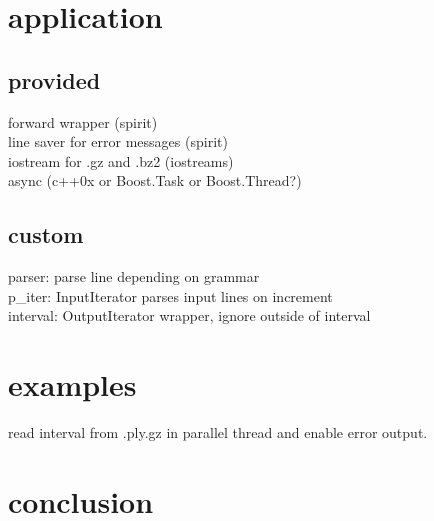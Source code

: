 \documentclass[a4paper,parskip=half]{scrartcl}
\begin{document}
\section{application}
%
\subsection{provided}
forward wrapper (spirit)\\
line saver for error messages (spirit)\\
iostream for .gz and .bz2 (iostreams)\\
async (c++0x or Boost.Task or Boost.Thread?)\\

\subsection{custom}
parser: parse line depending on grammar\\
p\_iter: InputIterator parses input lines on increment\\
interval: OutputIterator wrapper, ignore outside of interval\\

\section{examples}
read interval from .ply.gz in parallel thread and enable error output.

\section{conclusion}
\end{document}
